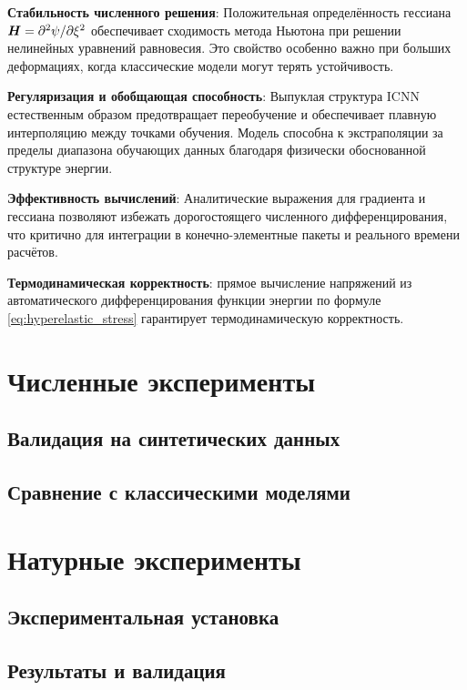 \textbf{Стабильность численного решения}: Положительная определённость гессиана \(\boldsymbol{H} = \partial^2\psi/\partial\xi^2\) обеспечивает сходимость метода Ньютона при решении нелинейных уравнений равновесия. Это свойство особенно важно при больших деформациях, когда классические модели могут терять устойчивость.

\textbf{Регуляризация и обобщающая способность}: Выпуклая структура ICNN естественным образом предотвращает переобучение и обеспечивает плавную интерполяцию между точками обучения. Модель способна к экстраполяции за пределы диапазона обучающих данных благодаря физически обоснованной структуре энергии.

\textbf{Эффективность вычислений}: Аналитические выражения для градиента и гессиана позволяют избежать дорогостоящего численного дифференцирования, что критично для интеграции в конечно-элементные пакеты и реального времени расчётов.

\textbf{Термодинамическая корректность}: прямое вычисление напряжений из автоматического дифференцирования функции энергии по формуле \eqref{eq:hyperelastic_stress} гарантирует термодинамическую корректность.

\section{Численные эксперименты}
\subsection{Валидация на синтетических данных}

\subsection{Сравнение с классическими моделями}


\section{Натурные эксперименты}
\subsection{Экспериментальная установка}

\subsection{Результаты и валидация}

